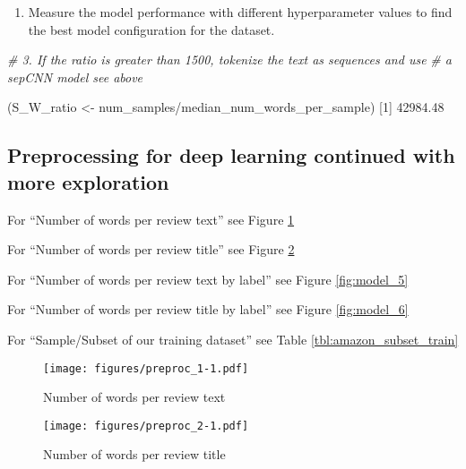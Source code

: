 \documentclass[
]{article}
\newenvironment{Shaded}{}{}
\newcommand{\CommentTok}[1]{\textcolor[rgb]{0.38,0.63,0.69}{\textit{#1}}}
\newcommand{\DecValTok}[1]{\textcolor[rgb]{0.25,0.63,0.44}{#1}}
\newcommand{\FloatTok}[1]{\textcolor[rgb]{0.25,0.63,0.44}{#1}}
\newcommand{\NormalTok}[1]{#1}
\newcommand{\OtherTok}[1]{\textcolor[rgb]{0.00,0.44,0.13}{#1}}
\newcommand{\SpecialCharTok}[1]{\textcolor[rgb]{0.25,0.44,0.63}{#1}}
\providecommand{\tightlist}{%
  \setlength{\itemsep}{0pt}\setlength{\parskip}{0pt}}
\begin{document}
\begin{enumerate}
\def\labelenumi{\arabic{enumi}.}
\setcounter{enumi}{3}
\tightlist
\item
  Measure the model performance with different hyperparameter values to
  find the best model configuration for the dataset.
\end{enumerate}

\begin{Shaded}
\begin{Highlighting}[]
\CommentTok{\# 3. If the ratio is greater than 1500, tokenize the text as sequences and use}
\CommentTok{\# a sepCNN model see above}

\NormalTok{(S\_W\_ratio }\OtherTok{\textless{}{-}}\NormalTok{ num\_samples}\SpecialCharTok{/}\NormalTok{median\_num\_words\_per\_sample)}
\NormalTok{[}\DecValTok{1}\NormalTok{] }\FloatTok{42984.48}
\end{Highlighting}
\end{Shaded}

\newpage

\hypertarget{preprocessing-for-deep-learning-continued-with-more-exploration}{%
\subsection{Preprocessing for deep learning continued with more
exploration}\label{preprocessing-for-deep-learning-continued-with-more-exploration}}

For ``Number of words per review text'' see Figure \ref{fig:model_3}

For ``Number of words per review title'' see Figure \ref{fig:model_4}

For ``Number of words per review text by label'' see Figure
\ref{fig:model_5}

For ``Number of words per review title by label'' see Figure
\ref{fig:model_6}

For ``Sample/Subset of our training dataset'' see Table
\ref{tbl:amazon_subset_train}

\begin{figure}
\centering
\texttt{[image: figures/preproc\_1-1.pdf]}
\caption{Number of words per review text\label{fig:model_3}}
\end{figure}

\begin{figure}
\centering
\texttt{[image: figures/preproc\_2-1.pdf]}
\caption{Number of words per review title\label{fig:model_4}}
\end{figure}
\end{document}
